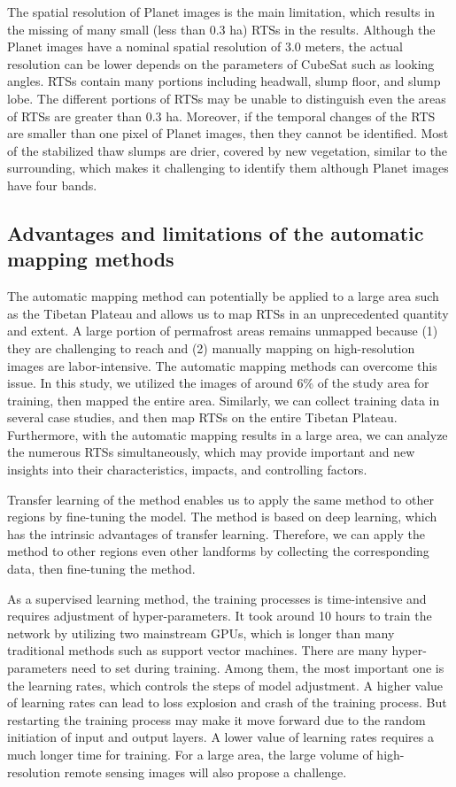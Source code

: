 \documentclass[preprint,12pt,authoryear]{elsarticle}
\begin{document}
The spatial resolution of Planet images is the main limitation, which results in the missing of many small (less than 0.3 ha) RTSs in the results. Although the Planet images have a nominal spatial resolution of 3.0 meters, the actual resolution can be lower depends on the parameters of CubeSat such as looking angles.
RTSs contain many portions including headwall, slump floor, and slump lobe. The different portions of RTSs may be unable to distinguish even the areas of RTSs are greater than 0.3 ha. Moreover, if the temporal changes of the RTS are smaller than one pixel of Planet images, then they cannot be identified. Most of the stabilized thaw slumps are drier, covered by new vegetation, similar to the surrounding, which makes it challenging to identify them although Planet images have four bands.

\subsection{Advantages and limitations of the automatic mapping methods}
\label{subsec_advantage_limitation_method}

The automatic mapping method can potentially be applied to a large area such as the Tibetan Plateau and allows us to map RTSs in an unprecedented quantity and extent. A large portion of permafrost areas remains unmapped because (1) they are challenging to reach and (2) manually mapping on high-resolution images are labor-intensive. The automatic mapping methods can overcome this issue. In this study, we utilized the images of around 6\% of the study area for training, then mapped the entire area. Similarly, we can collect training data in several case studies, and then map RTSs on the entire Tibetan Plateau. Furthermore, with the automatic mapping results in a large area, we can analyze the numerous RTSs simultaneously, which may provide important and new insights into their characteristics, impacts, and controlling factors.  

Transfer learning of the method enables us to apply the same method to other regions by fine-tuning the model. The method is based on deep learning, which has the intrinsic advantages of transfer learning. Therefore, we can apply the method to other regions even other landforms by collecting the corresponding data, then fine-tuning the method. 

As a supervised learning method, the training processes is time-intensive and requires adjustment of hyper-parameters. It took around 10 hours to train the network by utilizing two mainstream GPUs, which is longer than many traditional methods such as support vector machines. There are many hyper-parameters need to set during training. Among them, the most important one is the learning rates, which controls the steps of model adjustment. A higher value of learning rates can lead to loss explosion and crash of the training process. But restarting the training process may make it move forward due to the random initiation of input and output layers. A lower value of learning rates requires a much longer time for training. For a large area, the large volume of high-resolution remote sensing images will also propose a challenge.
\end{document}

